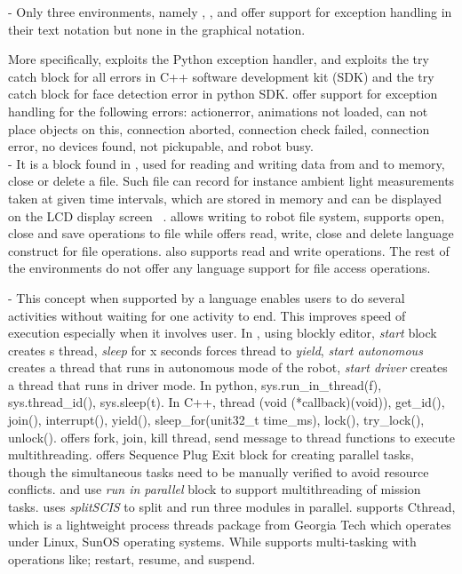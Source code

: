  - Only three environments, namely \openroberta, \choregraphe, and \codelab offer support for exception handling in their text notation but none in the graphical notation. %

More specifically, \openroberta exploits the Python exception handler, and \choregraphe exploits the try catch block for all errors in C++ software development kit (SDK) and the try catch block for face detection error in python SDK. \codelab offer support for exception handling for the following errors: actionerror, animations not loaded, can not place objects on this, connection aborted, connection check failed, connection error, no devices found, not pickupable, and robot busy.\\

 - It is a block found in \lego, used for reading and writing data from and to memory, close or delete a file. Such file can record for instance ambient light measurements taken at given time intervals, which are stored in memory and can be displayed on the LCD display screen ~\cite{LEGO}. \trik allows writing to robot file system, \choregraphe supports open, close and save operations to file while \missionlab offers read, write, close and delete language construct for file operations. \picaxe also supports read and write operations. The rest of the environments do not offer any language support for file access operations.

 - This concept when supported by a language enables users to do several activities without waiting for one activity to end. This improves speed of execution especially when it involves user. In \robotmesh,  using blockly editor,  \textit{start} block creates s thread, \textit{sleep} for x seconds forces thread to \textit{yield}, \textit{start autonomous} creates a thread that runs in autonomous mode of the robot, \textit{start driver} creates a thread that runs in driver mode. In python, sys.run\_in\_thread(f), sys.thread\_id(), sys.sleep(t). In C++, thread (void (*callback)(void)), get\_id(), join(), interrupt(), yield(), sleep\_for(unit32\_t time\_ms), lock(), try\_lock(), unlock(). \trik offers fork, join, kill thread, send message to thread functions to execute multithreading. \lego offers Sequence Plug Exit block for creating parallel tasks, though the simultaneous tasks need to be manually verified to avoid resource conflicts. \makecode and \robotc use \textit{run in parallel} block to support multithreading of mission tasks. \tivipe uses \textit{splitSCIS} to split and run three modules  in parallel. \missionlab supports Cthread, which is a lightweight process threads package from Georgia Tech which operates under Linux, SunOS operating systems. While \picaxe supports multi-tasking with operations like; restart, resume, and suspend.












